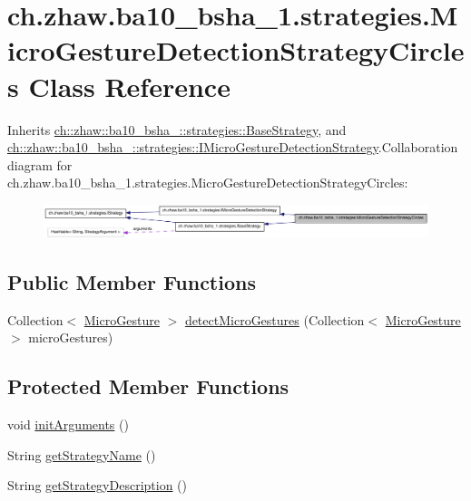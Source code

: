 \hypertarget{classch_1_1zhaw_1_1ba10__bsha__1_1_1strategies_1_1MicroGestureDetectionStrategyCircles}{
\section{ch.zhaw.ba10\_\-bsha\_\-1.strategies.MicroGestureDetectionStrategyCircles Class Reference}
\label{classch_1_1zhaw_1_1ba10__bsha__1_1_1strategies_1_1MicroGestureDetectionStrategyCircles}
}


Inherits \hyperlink{classch_1_1zhaw_1_1ba10__bsha__1_1_1strategies_1_1BaseStrategy}{ch::zhaw::ba10\_\-bsha\_::strategies::BaseStrategy}, and \hyperlink{interfacech_1_1zhaw_1_1ba10__bsha__1_1_1strategies_1_1IMicroGestureDetectionStrategy}{ch::zhaw::ba10\_\-bsha\_::strategies::IMicroGestureDetectionStrategy}.Collaboration diagram for ch.zhaw.ba10\_\-bsha\_\-1.strategies.MicroGestureDetectionStrategyCircles:\nopagebreak
\begin{figure}[H]
\begin{center}
\leavevmode
\includegraphics[width=400pt]{classch_1_1zhaw_1_1ba10__bsha__1_1_1strategies_1_1MicroGestureDetectionStrategyCircles__coll__graph}
\end{center}
\end{figure}
\subsection*{Public Member Functions}
\begin{DoxyCompactItemize}
\item 
Collection$<$ \hyperlink{classch_1_1zhaw_1_1ba10__bsha__1_1_1service_1_1MicroGesture}{MicroGesture} $>$ \hyperlink{classch_1_1zhaw_1_1ba10__bsha__1_1_1strategies_1_1MicroGestureDetectionStrategyCircles_a1ce3987ae892eba2d0cf644a111933d3}{detectMicroGestures} (Collection$<$ \hyperlink{classch_1_1zhaw_1_1ba10__bsha__1_1_1service_1_1MicroGesture}{MicroGesture} $>$ microGestures)
\end{DoxyCompactItemize}
\subsection*{Protected Member Functions}
\begin{DoxyCompactItemize}
\item 
void \hyperlink{classch_1_1zhaw_1_1ba10__bsha__1_1_1strategies_1_1MicroGestureDetectionStrategyCircles_a4c56ad33ccc912e20e7067d5b6334102}{initArguments} ()
\item 
String \hyperlink{classch_1_1zhaw_1_1ba10__bsha__1_1_1strategies_1_1MicroGestureDetectionStrategyCircles_a73a3d1a9b8047909777b53094ea99f9b}{getStrategyName} ()
\item 
String \hyperlink{classch_1_1zhaw_1_1ba10__bsha__1_1_1strategies_1_1MicroGestureDetectionStrategyCircles_af8c0c9ae9f2a172773c4a76833d2b687}{getStrategyDescription} ()
\end{DoxyCompactItemize}



